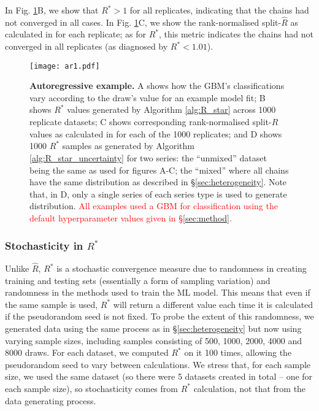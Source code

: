 \documentclass{article}
\begin{document}
In Fig. \ref{fig:ar1}B, we show that $R^*>1$ for all replicates, indicating that the chains had not converged in all cases. In Fig. \ref{fig:ar1}C, we show the rank-normalised split-$\widehat{R}$ as calculated in \cite{vehtari2019rank} for each replicate;  as for $R^*$, this metric indicates the chains had not converged in all replicates (as diagnosed by $R^*<1.01$).

\begin{figure}[!htb]
	\centerline{\texttt{[image: ar1.pdf]}}
	\caption{\textbf{Autoregressive example.} A shows how the GBM's classifications vary according to the draw's value for an example model fit; B shows $R^*$ values generated by Algorithm \ref{alg:R_star} across 1000 replicate datasets; C shows corresponding rank-normalised split-$\widehat{R}$ values as calculated in \cite{vehtari2019rank} for each of the 1000 replicates; and D shows 1000 $R^*$ samples as generated by Algorithm \ref{alg:R_star_uncertainty} for two series: the ``unmixed'' dataset being the same as used for figures A-C; the ``mixed'' where all chains have the same distribution as described in \S\ref{sec:heterogeneity}. Note that, in D, only a single series of each series type is used to generate distribution. \textcolor{red}{All examples used a GBM for classification using the default hyperparameter values given in \S\ref{sec:method}.}}
	\label{fig:ar1}
\end{figure}

\subsubsection{Stochasticity in $R^*$}\label{sec:heterogeneity_stochasticity}
Unlike $\widehat{R}$, $R^*$ is a stochastic convergence measure due to randomness in creating training and testing sets (essentially a form of sampling variation) and randomness in the methods used to train the ML model. This means that even if the same sample is used, $R^*$ will return a different value each time it is calculated if the pseudorandom seed is not fixed. To probe the extent of this randomness, we generated data using the same process as in \S\ref{sec:heterogeneity} but now using varying sample sizes, including samples consisting of 500, 1000, 2000, 4000 and 8000 draws. For each dataset, we computed $R^*$ on it 100 times, allowing the pseudorandom seed to vary between calculations. We stress that, for each sample size, we used the same dataset (so there were 5 datasets created in total -- one for each sample size), so stochasticity comes from $R^*$ calculation, not that from the data generating process.
\end{document}

